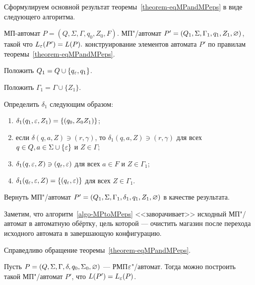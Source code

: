 Сформулируем основной результат теоремы~\ref{theorem-eqMPandMPeps} в виде следующего алгоритма.

{\label{algo-MPtoMPeps} МП-автомат $P = (Q, \Sigma, \Gamma, q_0, Z_0, F)$. }
{МП"/автомат $P' = (Q_1, \Sigma, \Gamma_1, q_1, Z_1, \varnothing)$, такой что $L_\varepsilon(P') = L(P).$}
{ конструирование элементов автомата $P'$ по правилам теоремы~\ref{theorem-eqMPandMPeps}.}
{
\item Положить $Q_1 = Q \cup \{ q_\varepsilon, q_1 \}$.

\item Положить $\Gamma_1 = \Gamma \cup \{Z_1\}$.

\item Определить $\delta_1$ следующим образом:
	\begin{enumerate}
		\item $\delta_1(q_1, \varepsilon, Z_1) = \{ (q_0, Z_0Z_1) \}$;
		\item если $\delta(q, a, Z) \ni (r, \gamma)$, то $\delta_1(q, a, Z) \ni (r, \gamma)$ для всех $q \in Q, a \in \Sigma \cup \{ \varepsilon \}$ и $Z \in \Gamma$;
		\item $\delta_1(q, \varepsilon, Z) \ni (q_\varepsilon, \varepsilon)$ для всех $a \in F$ и $Z \in \Gamma_1$;
		\item $\delta_1(q_\varepsilon, \varepsilon, Z) = \{ (q_\varepsilon, \varepsilon) \}$ для всех $Z \in \Gamma_1$.
  \end{enumerate}  

\item Вернуть МП"/автомат $P' = (Q_1, \Sigma, \Gamma_1, \delta_1, q_1, Z_1, \varnothing)$ в качестве результата.
} 

Заметим, что алгоритм~\ref{algo-MPtoMPeps} <<заворачивает>> исходный МП"/автомат в автоматную обёртку, цель которой --- очистить магазин после перехода исходного автомата в завершающую конфигурацию. 

Справедливо обращение теоремы~\ref{theorem-eqMPandMPeps}.

\begin{mytheorem}
\label{theorem-eqRMPandMPeps}
Пусть $P=(Q,\Sigma,\Gamma,\delta,q_0,\Sigma_0,\varnothing)$ --- РМП$\varepsilon$"/автомат. Тогда можно построить такой МП"/автомат $P'$, что $L(P')=L_\varepsilon(P)$.
\end{mytheorem}


